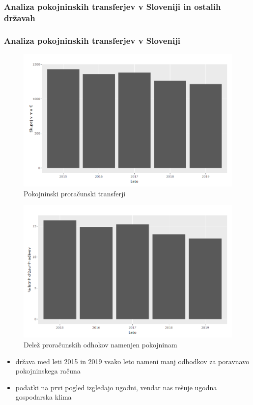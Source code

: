 \documentclass[10pt]{beamer}
\begin{document}
\begin{frame}
\subsubsection[Analiza pokojninskih transferjev v Sloveniji in ostalih državah]{Analiza pokojninskih transferjev v Sloveniji in ostalih državah}
\frametitle{Analiza pokojninskih transferjev v Sloveniji}
\begin{figure}[h!]
\centering
\includegraphics[width = 10 cm]{pokojnine_slovenija.png}
\caption{Pokojninski proračunski transferji}
\label{Slika 6}
\end{figure}
\end{frame}

\begin{frame}
\begin{figure}[h!]
\centering
\includegraphics[width = 8 cm]{pokojnine_procentualno.png}
\caption{Delež proračunskih odhokov namenjen pokojninam}
\label{Slika 7}
\end{figure}

\begin{itemize}
\item država med leti 2015 in 2019 vsako leto nameni manj odhodkov za poravnavo pokojninskega računa
\item podatki na prvi pogled izgledajo ugodni, vendar nas rešuje ugodna gospodarska klima
\end{itemize}
\end{frame}
\end{document}
